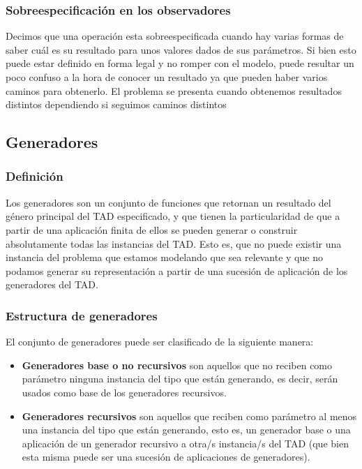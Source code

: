 \documentclass[10pt, a4paper]{report}
\begin{document}
\subsubsection*{Sobreespecificaci\'on en los observadores}
Decimos que una operaci\'on esta sobreespecificada cuando hay varias formas de saber cu\'al es su resultado para unos valores dados de sus par\'ametros. Si bien esto puede estar definido en forma legal y no romper con el modelo, puede resultar un poco confuso a la hora de conocer un resultado ya que pueden haber varios caminos para obtenerlo. El problema se presenta cuando obtenemos resultados distintos dependiendo si seguimos caminos distintos

\newpage

\subsection{Generadores}

\subsubsection*{Definici\'on}
Los generadores son un conjunto de funciones que retornan un resultado del g\'enero principal del TAD especificado, y que tienen la particularidad de que a partir de una aplicaci\'on finita de ellos se pueden generar o construir absolutamente todas las instancias del TAD. Esto es, que no puede existir una instancia del problema que estamos modelando que sea relevante y que no podamos generar su representaci\'on a partir de una sucesi\'on de aplicaci\'on de los generadores del TAD.

\subsubsection*{Estructura de generadores}
El conjunto de generadores puede ser clasificado de la siguiente manera:

\begin{itemize}
 \item \textbf{Generadores base o no recursivos} son aquellos que no reciben como par\'ametro ninguna instancia del tipo que est\'an generando, es decir, ser\'an usados como base de los generadores recursivos.
 \item \textbf{Generadores recursivos} son aquellos que reciben como par\'ametro al menos una instancia del tipo que est\'an generando, esto es, un generador base o una aplicaci\'on de un generador recursivo a otra/s instancia/s del TAD (que bien esta misma puede ser una sucesi\'on de aplicaciones de generadores).
\end{itemize}
\end{document}
